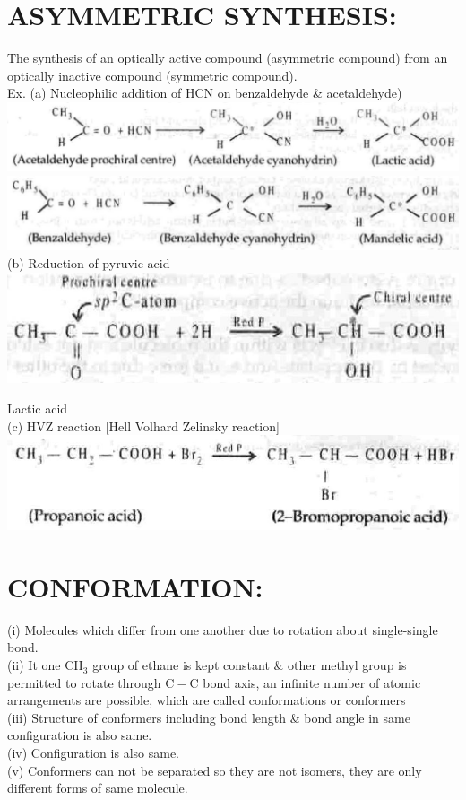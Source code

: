\documentclass[10pt]{article}
\begin{document}
\section*{ASYMMETRIC SYNTHESIS:}
The synthesis of an optically active compound (asymmetric compound) from an optically inactive compound (symmetric compound).\\
Ex. (a) Nucleophilic addition of HCN on benzaldehyde \& acetaldehyde)\\
\includegraphics[max width=\textwidth, center]{2025_01_28_8470952b98110cec3aabg-058(5)}\\
\includegraphics[max width=\textwidth, center]{2025_01_28_8470952b98110cec3aabg-058}\\
(b) Reduction of pyruvic acid\\
\includegraphics[max width=\textwidth, center]{2025_01_28_8470952b98110cec3aabg-058(3)}

Lactic acid\\[0pt]
(c) HVZ reaction [Hell Volhard Zelinsky reaction]\\
\includegraphics[max width=\textwidth, center]{2025_01_28_8470952b98110cec3aabg-059}

\section*{CONFORMATION:}
(i) Molecules which differ from one another due to rotation about single-single bond.\\
(ii) It one $\mathrm{CH}_{3}$ group of ethane is kept constant \& other methyl group is permitted to rotate through $\mathrm{C}-\mathrm{C}$ bond axis, an infinite number of atomic arrangements are possible, which are called conformations or conformers\\
(iii) Structure of conformers including bond length \& bond angle in same configuration is also same.\\
(iv) Configuration is also same.\\
(v) Conformers can not be separated so they are not isomers, they are only different forms of same molecule.
\end{document}
